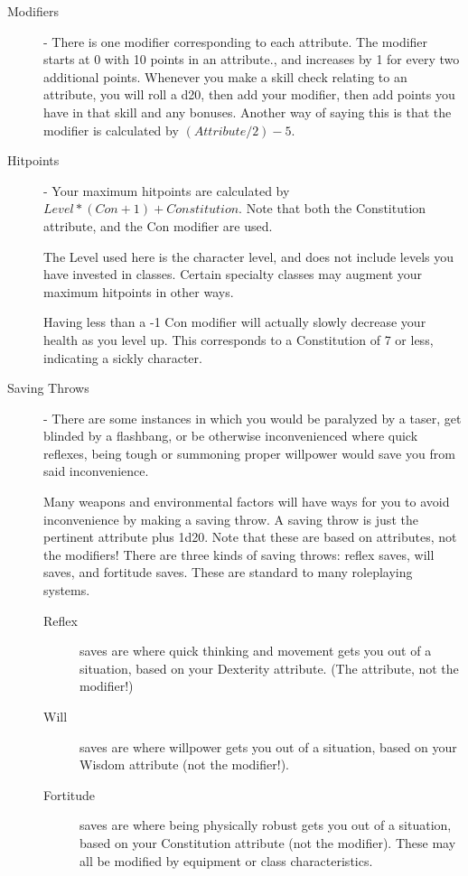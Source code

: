 \begin{description}
	\item[Modifiers] - There is one modifier corresponding to each attribute. The modifier starts at 0 with 10 points in an attribute., and increases by 1 for every two additional points. Whenever you make a skill check relating to an attribute, you will roll a d20, then add your modifier, then add points you have in that skill and any bonuses. Another way of saying this is that the modifier is calculated by $(Attribute/2) - 5 $.
	\item[Hitpoints] - Your maximum hitpoints are calculated by $Level*(Con+1) + Constitution$. Note that both the Constitution attribute, and the Con modifier are used.
	
	The Level used here is the character level, and does not include levels you have invested in classes. Certain specialty classes may augment your maximum hitpoints in other ways.
	
	Having less than a -1 Con modifier will actually slowly decrease your health as you level up. This corresponds to a Constitution of 7 or less, indicating a sickly character.

	\item[Saving Throws] - There are some instances in which you would be paralyzed by a taser, get blinded by a flashbang, or be otherwise inconvenienced where quick reflexes, being tough or summoning proper willpower would save you from said inconvenience.
	
	Many weapons and environmental factors will have ways for you to avoid inconvenience by making a saving throw. A saving throw is just the pertinent attribute plus 1d20. Note that these are based on attributes, not the modifiers! There are three kinds of saving throws: reflex saves, will saves, and fortitude saves. These are standard to many roleplaying systems.
	\begin{description}
		\item[Reflex] saves are where quick thinking and movement gets you out of a situation, based on your Dexterity attribute. (The attribute, not the modifier!)
		\item[Will] saves are where willpower gets you out of a situation, based on your Wisdom attribute (not the modifier!). 
		\item[Fortitude] saves are where being physically robust gets you out of a situation, based on your Constitution attribute (not the modifier).
		These may all be modified by equipment or class characteristics.
	\end{description}
	

\end{description}
